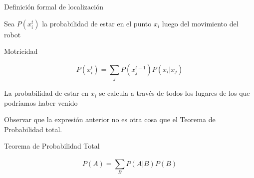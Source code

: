 \begin{frame}{Definición formal de localización}
    
    Sea $P(x_{i}^{t})$ la probabilidad de estar en el punto $x_{i}$ luego del movimiento del robot
    
    \begin{block}{Motricidad}
        
        \begin{displaymath}
            P(x_{i}^{t}) = \sum_{j} P(x_{j}^{t-1}) P(x_{i}|x_{j})
        \end{displaymath}
        
    \end{block}
    
    La probabilidad de estar en $x_{i}$ se calcula a través de todos los lugares de los que podríamos haber venido
    
    Observar que la expresión anterior no es otra cosa que el Teorema de Probabilidad total.
    
    \begin{block}{Teorema de Probabilidad Total}
        
        \begin{displaymath}
            P(A) = \sum_{B}^{}P(A|B) P(B)
        \end{displaymath}
        
    \end{block}
    
\end{frame}




